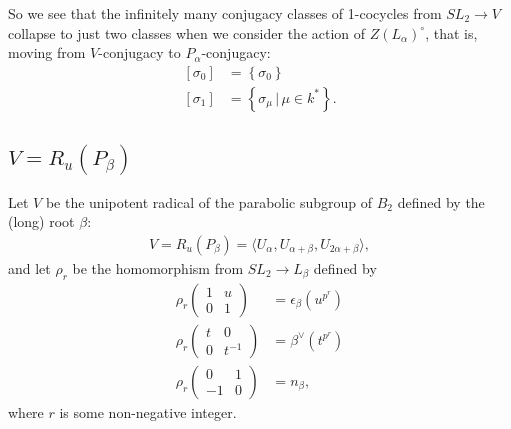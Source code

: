 		So we see that the infinitely many conjugacy classes of 1-cocycles from $SL_2\rightarrow V$ collapse to just two classes when we consider the action of $Z(L_\alpha)^\circ$, that is, moving from $V$-conjugacy to $P_\alpha$-conjugacy:
		\begin{align*}
		\left[ \sigma_0 \right] &= \left\{ \sigma_0 \right\} \\
															 \left[ \sigma_1 \right] &= \left\{ \sigma_\mu \, |\, \mu \in k^* \right\}.
															 \end{align*}

															 \subsection{$V = R_u(P_\beta)$}
															 \label{b2:beta}

															 Let $V$ be the unipotent radical of the parabolic subgroup of $B_2$ defined by the (long) root $\beta$:
															 \begin{align*}
															 V=R_u(P_\beta)=\langle U_\alpha, U_{\alpha + \beta}, U_{2\alpha + \beta} \rangle,
															 \end{align*}
															 and let $\rho_r$ be the homomorphism from $SL_2 \rightarrow L_\beta$ defined by
															 \begin{align*}
															 \rho_r\left(\begin{matrix} 1 & u \\ 0 & 1\end{matrix}\right) &= \epsilon_\beta(u^{p^r}) \\
																 \rho_r\left(\begin{matrix} t & 0 \\ 0 & t^{-1}\end{matrix}\right) &= \beta^\vee(t^{p^r}) \\
																 \rho_r\left(\begin{matrix} 0 & 1 \\ -1 & 0\end{matrix}\right) &= n_\beta,
															 \end{align*}
															 where $r$ is some non-negative integer.

